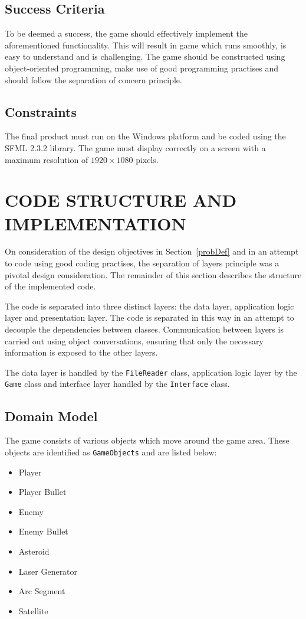 \documentclass[10pt,twocolumn]{witseiepaper}
\begin{document}
\subsection{Success Criteria}

To be deemed a success, the game should effectively implement the aforementioned functionality. This will result in game which runs smoothly, is easy to understand and is challenging. The game should be constructed using object-oriented programming, make use of good programming practises and should follow the separation of concern principle. 

\subsection{Constraints}

The final product must run on the Windows platform and be coded using the SFML 2.3.2 library. The game must display correctly on a screen with a maximum resolution of $1920 \times 1080$ pixels.

\section{CODE STRUCTURE AND IMPLEMENTATION}

On consideration of the design objectives in Section~\ref{probDef} and in an attempt to code using good coding practises, the separation of layers principle was a pivotal design consideration. The remainder of this section describes the structure of the implemented code.

The code is separated into three distinct layers: the data layer, application logic layer and presentation layer. The code is separated in this way in an attempt to decouple the dependencies between classes. Communication between layers is carried out using object conversations, ensuring that only the necessary information is exposed to the other layers.

The data layer is handled by the \texttt{FileReader} class, application logic layer by the \texttt{Game} class and interface layer handled by the \texttt{Interface} class.

\subsection{Domain Model}

The game consists of various objects which move around the game area. These objects are identified as \texttt{GameObjects} and are listed below:
\begin{itemize}
	\item Player
	\item Player Bullet
	\item Enemy
	\item Enemy Bullet
	\item Asteroid
	\item Laser Generator
	\item Arc Segment
	\item Satellite
\end{itemize}
\end{document}
